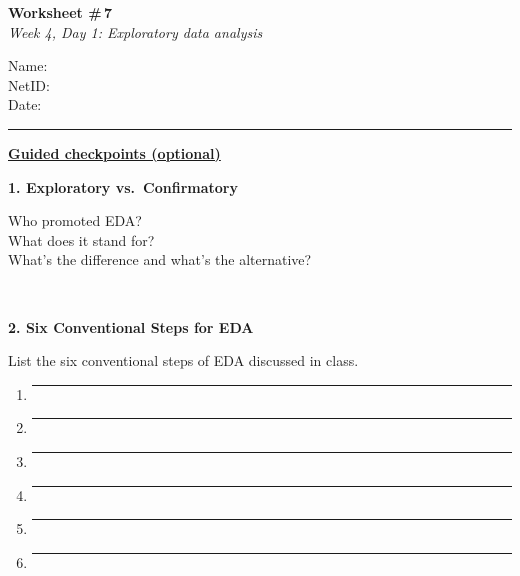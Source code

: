 \documentclass[11pt]{article}
\newcommand{\blankspace}[1]{%
  \vspace{0.3em}
  \begin{minipage}[t][#1][t]{\linewidth}
  \end{minipage}
  \vspace{0.3em}
}
\newcommand{\guidedopen}[4]{%
  \noindent\textbf{#1}\\[0.18em]
  \noindent
  \begin{minipage}[t]{0.485\textwidth}
    #2
    \blankspace{#3}
  \end{minipage}
  \hfill
  \begin{minipage}[t]{0.485\textwidth}
    \blankspace{#4}
  \end{minipage}
  \\[0.4em]
}
\begin{document}
\RaggedRight

\noindent
\begin{minipage}[t]{0.55\textwidth}
  \vspace{0pt}
  {\LARGE \textbf{Worksheet \#\,7}} \\[0.18em]
  {\large \textit{Week 4, Day 1: Exploratory data analysis}}
\end{minipage}
\hfill
\begin{minipage}[t]{0.40\textwidth}
  \vspace{0pt}
  \small
  Name: \underline{\hspace{4.5cm}} \\[0.35em]
  NetID: \underline{\hspace{4.3cm}} \\[0.35em]
  Date: \underline{\hspace{4.4cm}} \\
\end{minipage}

\vspace{0.6em}
\noindent\rule{\linewidth}{0.6pt}
\vspace{0.1em}

\noindent\underline{\textbf{Guided checkpoints (optional)}}
\vspace{0.8em}

\guidedopen{1. Exploratory vs.\ Confirmatory}{
Who promoted EDA?\\
What does it stand for?\\
What's the difference and what's the alternative?
}{2.2cm}{3.0cm}

\vfill

\guidedopen{2. Six Conventional Steps for EDA}{
List the six conventional steps of EDA discussed in class.
\begin{enumerate}[itemsep=0.2em]
  \item \rule{\linewidth}{0.4pt}%
  \item \rule{\linewidth}{0.4pt}%
  \item \rule{\linewidth}{0.4pt}%
  \item \rule{\linewidth}{0.4pt}%
  \item \rule{\linewidth}{0.4pt}%
  \item \rule{\linewidth}{0.4pt}%
\end{enumerate}
}{1.2cm}{2.2cm}
\end{document}
